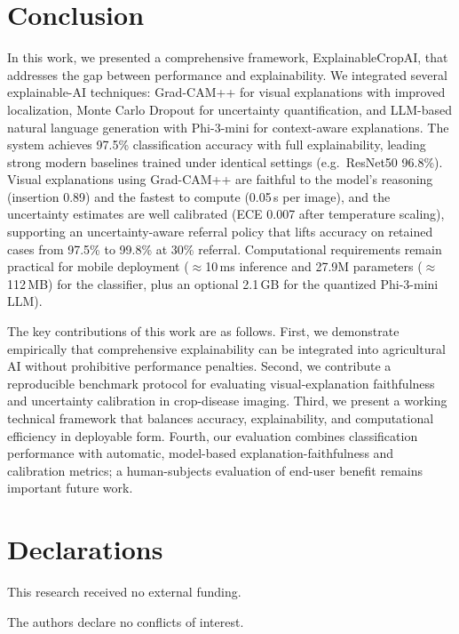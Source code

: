 \documentclass[pdflatex,sn-mathphys-num]{sn-jnl}%
\begin{document}
\section{Conclusion}\label{sec:conclusion}

In this work, we presented a comprehensive framework, ExplainableCropAI, that addresses the gap between performance and explainability. We integrated several explainable-AI techniques: Grad-CAM++ for visual explanations with improved localization, Monte Carlo Dropout for uncertainty quantification, and LLM-based natural language generation with Phi-3-mini for context-aware explanations. The system achieves 97.5\% classification accuracy with full explainability, leading strong modern baselines trained under identical settings (e.g.\ ResNet50 96.8\%). Visual explanations using Grad-CAM++ are faithful to the model's reasoning (insertion 0.89) and the fastest to compute (0.05\,s per image), and the uncertainty estimates are well calibrated (ECE 0.007 after temperature scaling), supporting an uncertainty-aware referral policy that lifts accuracy on retained cases from 97.5\% to 99.8\% at 30\% referral. Computational requirements remain practical for mobile deployment ($\approx$10\,ms inference and 27.9M parameters ($\approx$112\,MB) for the classifier, plus an optional 2.1\,GB for the quantized Phi-3-mini LLM).

The key contributions of this work are as follows. First, we demonstrate empirically that comprehensive explainability can be integrated into agricultural AI without prohibitive performance penalties. Second, we contribute a reproducible benchmark protocol for evaluating visual-explanation faithfulness and uncertainty calibration in crop-disease imaging. Third, we present a working technical framework that balances accuracy, explainability, and computational efficiency in deployable form. Fourth, our evaluation combines classification performance with automatic, model-based explanation-faithfulness and calibration metrics; a human-subjects evaluation of end-user benefit remains important future work.


\backmatter

\section*{Declarations}

This research received no external funding.

The authors declare no conflicts of interest.
\end{document}
